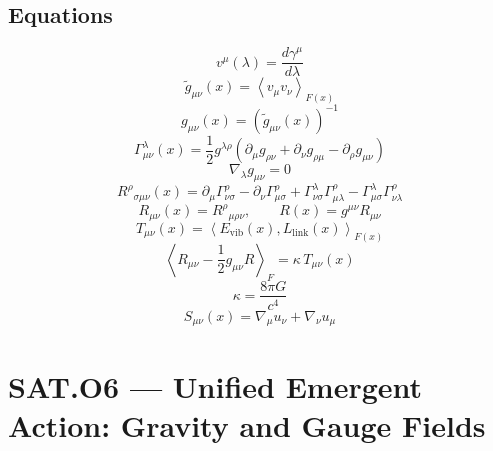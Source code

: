 \documentclass[11pt]{article}
\begin{document}
\subsection*{Equations}
\begin{equation*}
 v^\mu(\lambda)=\frac{d\gamma^\mu}{d\lambda}
\end{equation*}
\begin{equation*}
 \widetilde g_{\mu\nu}(x)=\left\langle v_\mu v_\nu\right\rangle_{F(x)}
\end{equation*}
\begin{equation*}
 g_{\mu\nu}(x)=\left(\widetilde g_{\mu\nu}(x)\right)^{-1}
\end{equation*}
\begin{equation*}
 \Gamma^\lambda_{\mu\nu}(x)=\frac{1}{2}g^{\lambda\rho}
 \left(\partial_\mu g_{\rho\nu}+\partial_\nu g_{\rho\mu}-\partial_\rho g_{\mu\nu}\right)
\end{equation*}
\begin{equation*}
 \nabla_\lambda g_{\mu\nu}=0
\end{equation*}
\begin{equation*}
 R^\rho{}_{\sigma\mu\nu}(x)=\partial_\mu\Gamma^\rho_{\nu\sigma}
 -\partial_\nu\Gamma^\rho_{\mu\sigma}
 +\Gamma^\lambda_{\nu\sigma}\Gamma^\rho_{\mu\lambda}
 -\Gamma^\lambda_{\mu\sigma}\Gamma^\rho_{\nu\lambda}
\end{equation*}
\begin{equation*}
 R_{\mu\nu}(x)=R^\rho{}_{\mu\rho\nu},\qquad
 R(x)=g^{\mu\nu}R_{\mu\nu}
\end{equation*}
\begin{equation*}
 T_{\mu\nu}(x)=\left\langle E_{\mathrm{vib}}(x),L_{\mathrm{link}}(x)\right\rangle_{F(x)}
\end{equation*}
\begin{equation*}
 \left\langle R_{\mu\nu}-\frac{1}{2}g_{\mu\nu}R\right\rangle_F
 =\kappa\,T_{\mu\nu}(x)
\end{equation*}
\begin{equation*}
 \kappa=\frac{8\pi G}{c^4}
\end{equation*}
\begin{equation*}
 S_{\mu\nu}(x)=\nabla_\mu u_\nu+\nabla_\nu u_\mu
\end{equation*}

\clearpage
\section*{SAT.O6 --- Unified Emergent Action: Gravity and Gauge Fields}
\end{document}
